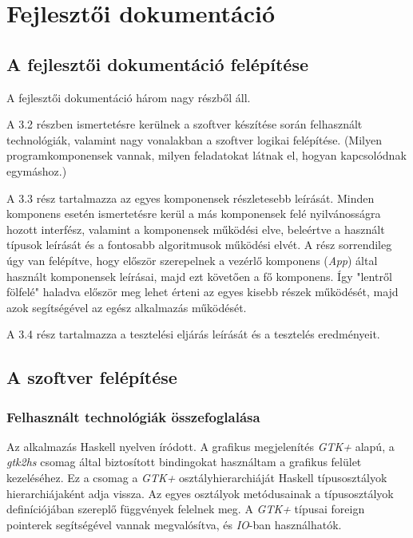 \chapter{Fejlesztői dokumentáció} %
\label{ch:impl}

\section{A fejlesztői dokumentáció felépítése}

A fejlesztői dokumentáció három nagy részből áll. 

A 3.2 részben ismertetésre kerülnek a szoftver készítése során felhasznált technológiák, valamint nagy vonalakban a szoftver logikai felépítése. (Milyen programkomponensek vannak, milyen feladatokat látnak el, hogyan kapcsolódnak egymáshoz.) 

A 3.3 rész tartalmazza az egyes komponensek részletesebb leírását. Minden komponens esetén ismertetésre kerül a más komponensek felé nyilvánosságra hozott interfész, valamint a komponensek működési elve, beleértve a használt típusok leírását és a fontosabb algoritmusok működési elvét. A rész sorrendileg úgy van felépítve, hogy először szerepelnek a vezérlő komponens (\textit{App}) által használt komponensek leírásai, majd ezt követően a fő komponens. Így "lentről fölfelé" haladva először meg lehet érteni az egyes kisebb részek működését, majd azok segítségével az egész alkalmazás működését.

A 3.4 rész tartalmazza a tesztelési eljárás leírását és a tesztelés eredményeit. 

\section{A szoftver felépítése}

\subsection{Felhasznált technológiák összefoglalása}

Az alkalmazás Haskell nyelven íródott. A grafikus megjelenítés \textit{GTK+} alapú, a \textit{gtk2hs} csomag által biztosított bindingokat használtam a grafikus felület kezeléséhez. Ez a csomag a \textit{GTK+} osztályhierarchiáját Haskell típusosztályok hierarchiájaként adja vissza. Az egyes osztályok metódusainak a típusosztályok definíciójában szereplő függvények felelnek meg. A \textit{GTK+} típusai foreign pointerek segítségével vannak megvalósítva, és \textit{IO}-ban használhatók. 

